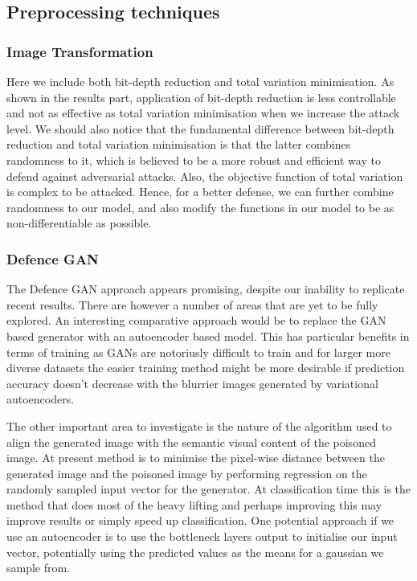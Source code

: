 \subsection{Preprocessing techniques}

\subsubsection{Image Transformation}
Here we include both bit-depth reduction and total variation minimisation. As shown in the results part, application of bit-depth reduction is less controllable and not as effective as total variation minimisation when we increase the attack level. We should also notice that the fundamental difference between bit-depth reduction and total variation minimisation is that the latter combines randomness to it, which is believed to be a more robust and efficient way to defend against adversarial attacks. Also, the objective function of total variation is complex to be attacked. Hence, for a better defense, we can further combine randomness to our model, and also modify the functions in our model to be as non-differentiable as possible. 

\subsubsection{Defence GAN}
The Defence GAN approach appears promising, despite our inability to replicate recent results.  There are however a number of areas that are yet to be fully explored.  An interesting comparative approach would be to replace the GAN based generator with an autoencoder based model.  This has particular benefits in terms of training as GANs are notoriusly difficult to train and for larger more diverse datasets the easier training method might be more desirable if prediction accuracy doesn't decrease with the blurrier images generated by variational autoencoders.

The other important area to investigate is the nature of the algorithm used to align the generated image with the semantic visual content of the poisoned image.  At present method is to minimise the pixel-wise distance between the generated image and the poisoned image by performing regression on the randomly sampled input vector for the generator.  At classification time this is the method that does most of the heavy lifting and perhaps improving this may improve results or simply speed up classification.  One potential approach if we use an autoencoder is to use the bottleneck layers output to initialise our input vector, potentially using the predicted values as the means for a gaussian we sample from.

